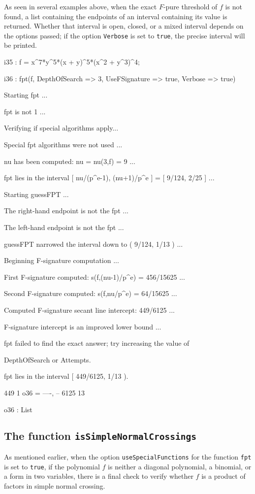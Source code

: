\documentclass{amsart}
\begin{document}
As seen in several examples above, when the exact  $F$-pure threshold of $f$ is not found, a list containing the endpoints of an interval containing its value is returned.  Whether that interval is open, closed, or a mixed interval depends on the options passed; if the option {\tt Verbose} is set to {\tt true}, the precise interval will be printed.

{\small
{}
\begin{MyVerbatim}

i35 : f = x^7*y^5*(x + y)^5*(x^2 + y^3)^4;

i36 : fpt(f, DepthOfSearch => 3, UseFSignature => true, Verbose => true)

Starting fpt ...

fpt is not 1 ...

Verifying if special algorithms apply...

Special fpt algorithms were not used ...

nu has been computed: nu = nu(3,f) = 9 ...

fpt lies in the interval [ nu/(p^e-1), (nu+1)/p^e ] = [ 9/124, 2/25 ] ...

Starting guessFPT ...

The right-hand endpoint is not the fpt ...

The left-hand endpoint is not the fpt ...

guessFPT narrowed the interval down to ( 9/124, 1/13 ) ...

Beginning F-signature computation ...

First F-signature computed: s(f,(nu-1)/p^e) = 456/15625 ...

Second F-signature computed: s(f,nu/p^e) = 64/15625 ...

Computed F-signature secant line intercept: 449/6125 ...

F-signature intercept is an improved lower bound ...

fpt failed to find the exact answer; try increasing the value of

DepthOfSearch or Attempts.

fpt lies in the interval [ 449/6125, 1/13 ).

        449   1
o36 = {----, --}
       6125  13

o36 : List
\end{MyVerbatim}
}
\medspace

\subsection{The function {\tt isSimpleNormalCrossings}} \label{subsec.SNC}
As mentioned earlier, 
when the option {\tt useSpecialFunctions} for the function {\tt fpt} is set to {\tt true}, if the polynomial $f$ is neither a diagonal polynomial, a binomial, or a form in two variables, there is a final check to verify whether $f$ is a product of factors in simple normal crossing. 
\end{document}
